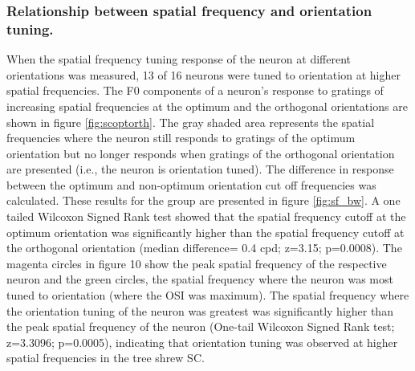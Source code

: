 	\subsubsection{Relationship between spatial frequency and orientation tuning.}
	When the spatial frequency tuning response of the neuron at different
	orientations was measured, 13 of 16 neurons were tuned to orientation at
	higher spatial frequencies. The F0 components of a neuron's response to
	gratings of increasing spatial frequencies at the optimum and the
	orthogonal orientations are shown in figure \ref{fig:scoptorth}. The gray shaded area
	represents the spatial frequencies where the neuron still responds to
	gratings of the optimum orientation but no longer responds when gratings
	of the orthogonal orientation are presented (i.e., the neuron is
	orientation tuned). The difference in response between the optimum and
	non-optimum orientation cut off frequencies was calculated. These
	results for the group are presented in figure \ref{fig:sf_bw}. A one tailed Wilcoxon
	Signed Rank test showed that the spatial frequency cutoff at the optimum
	orientation was significantly higher than the spatial frequency cutoff
	at the orthogonal orientation (median difference= 0.4 cpd; z=3.15;
	p=0.0008). The magenta circles in figure 10 show the peak spatial
	frequency of the respective neuron and the green circles, the spatial
	frequency where the neuron was most tuned to orientation (where the OSI
	was maximum). The spatial frequency where the orientation tuning of the
	neuron was greatest was significantly higher than the peak spatial
	frequency of the neuron (One-tail Wilcoxon Signed Rank test; z=3.3096;
	p=0.0005), indicating that orientation tuning was observed at higher
	spatial frequencies in the tree shrew SC.
	
